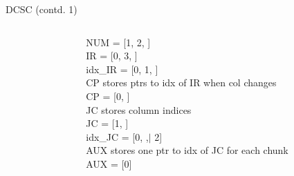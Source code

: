 \documentclass[12pt, usenames, dvipsnames]{beamer}
\begin{document}
\begin{frame}[fragile]{DCSC (contd. 1)}
\begin{columns}
\begin{column}{0.5\textwidth}
\end{column}
\begin{column}{0.5\textwidth}  %
\begin{center}
	NUM = [1, 2, \hspace{0.5cm}  \hspace{0.5cm}] \\
	\vspace{0.3cm}
    IR  = [0, 3, \hspace{0.5cm}\hspace{0.5cm}] \\
    \vspace{0.1cm}
	idx\_IR = [0, 1, \hspace{0.5cm}\hspace{0.5cm}] \\
	\vspace{0.2cm}
    CP stores ptrs to idx of IR when col changes \\
    CP = [0, \hspace{0.5cm}\hspace{0.5cm}] \\
	\vspace{0.3cm}
	JC stores column indices \\
    JC = [1, \hspace{0.5cm}\hspace{0.5cm}] \\
	\vspace{0.3cm}
	idx\_JC = [0, \hspace{0.5cm}\hspace{0.5cm},$\mid$ 2] \\
	\vspace{0.3cm}
	AUX stores one ptr to idx of JC for each chunk\\
	AUX = [0] \\
\end{center}
	
\end{column}
\end{columns}
\end{frame}
\end{document}
